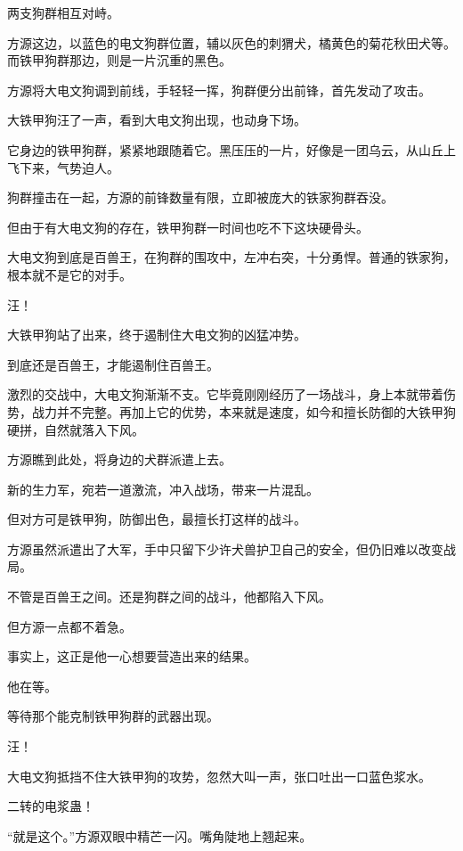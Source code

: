 
\begin{this_body}



两支狗群相互对峙。

方源这边，以蓝色的电文狗群位置，辅以灰色的刺猬犬，橘黄色的菊花秋田犬等。而铁甲狗群那边，则是一片沉重的黑色。

方源将大电文狗调到前线，手轻轻一挥，狗群便分出前锋，首先发动了攻击。

大铁甲狗汪了一声，看到大电文狗出现，也动身下场。

它身边的铁甲狗群，紧紧地跟随着它。黑压压的一片，好像是一团乌云，从山丘上飞下来，气势迫人。

狗群撞击在一起，方源的前锋数量有限，立即被庞大的铁家狗群吞没。

但由于有大电文狗的存在，铁甲狗群一时间也吃不下这块硬骨头。

大电文狗到底是百兽王，在狗群的围攻中，左冲右突，十分勇悍。普通的铁家狗，根本就不是它的对手。

汪！

大铁甲狗站了出来，终于遏制住大电文狗的凶猛冲势。

到底还是百兽王，才能遏制住百兽王。

激烈的交战中，大电文狗渐渐不支。它毕竟刚刚经历了一场战斗，身上本就带着伤势，战力并不完整。再加上它的优势，本来就是速度，如今和擅长防御的大铁甲狗硬拼，自然就落入下风。

方源瞧到此处，将身边的犬群派遣上去。

新的生力军，宛若一道激流，冲入战场，带来一片混乱。

但对方可是铁甲狗，防御出色，最擅长打这样的战斗。

方源虽然派遣出了大军，手中只留下少许犬兽护卫自己的安全，但仍旧难以改变战局。

不管是百兽王之间。还是狗群之间的战斗，他都陷入下风。

但方源一点都不着急。

事实上，这正是他一心想要营造出来的结果。

他在等。

等待那个能克制铁甲狗群的武器出现。

汪！

大电文狗抵挡不住大铁甲狗的攻势，忽然大叫一声，张口吐出一口蓝色浆水。

二转的电浆蛊！

“就是这个。”方源双眼中精芒一闪。嘴角陡地上翘起来。


\end{this_body}
